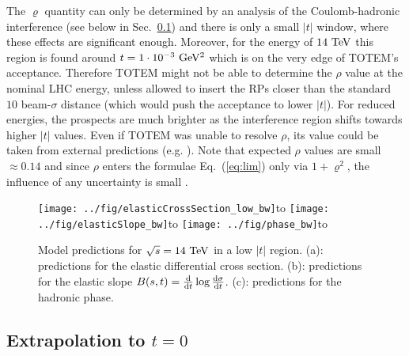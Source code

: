 \documentclass{desyproc}
\def\rh{\varrho}
\def\si{\sigma}
\def\un#1{\ {\rm #1}}
\def\subtitle#1#2{\vbox{\setbox0\hbox{#1}\copy0\hbox to\wd0{\hss#2\hss}}}
\def\d{{\rm d}}
\begin{document}
The $\rh$ quantity can only be determined by an analysis of the Coulomb-hadronic interference (see below in Sec.~\ref{sec:extrapolation}) and there is only a small $|t|$ window, where these effects are significant enough. Moreover, for the energy of $14\un{TeV}$ this region is found around $t=1\cdot10^{-3}\un{GeV^2}$ which is on the very edge of TOTEM's acceptance. Therefore TOTEM might not be able to determine the $\rho$ value at the nominal LHC energy, unless allowed to insert the RPs closer than the standard $10$ beam-$\si$ distance (which would push the acceptance to lower $|t|$). 
For reduced energies, the prospects are much brighter as the interference region shifts towards higher $|t|$ values. Even if TOTEM was unable to resolve $\rho$, its value could be taken from external predictions (e.g. \cite{cudell}). Note that expected $\rho$ values are small $\approx 0.14$ and since $\rho$ enters the formulae Eq.~(\ref{eq:lim}) only via $1+\rh^2$, the influence of any uncertainty is small \cite{jinst,mario}.






\begin{figure}[htb]
\centerline{\hss
	\subtitle{\texttt{[image: ../fig/elasticCrossSection\_low\_bw]}}{(a)}\hfil
	\subtitle{\texttt{[image: ../fig/elasticSlope\_bw]}}{(b)}\hss
	\subtitle{\texttt{[image: ../fig/phase\_bw]}}{(c)}\hss
}%
\caption{Model predictions for $\sqrt{s}=14\un{TeV}$ in a low $|t|$ region. (a): predictions for the elastic differential cross section. (b): predictions for the elastic slope $B(s, t) = {\d\over\d t} \log {\d\si\over\d t}$. (c): predictions for the hadronic phase.}%
\label{fig:models low}%
\end{figure}

\subsection{Extrapolation to $t = 0$}\label{sec:extrapolation}
\end{document}
